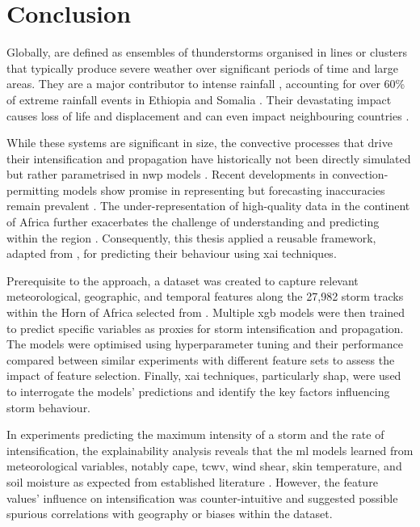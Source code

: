 \chapter{Conclusion}
\label{ch:con}

Globally,  are defined as ensembles of thunderstorms organised in lines or clusters that typically produce severe weather over significant periods of time and large areas. They are a major contributor to intense rainfall \citep{Houze2004}, accounting for over 60\% of extreme rainfall events in Ethiopia and Somalia \citep{Hill2023}. Their devastating impact causes loss of life and displacement and can even impact neighbouring countries \citep{Mamo2019,Mekuria2022,Legese2020,Zaroug2014}. 

While these systems are significant in size, the convective processes that drive their intensification and propagation have historically not been directly simulated but rather parametrised in \acrfull{nwp} models \citep{Stevens2019,Yano2018,Keane2025}. Recent developments in convection-permitting models show promise in representing  but forecasting inaccuracies remain prevalent \citep{Feng2025,Yano2018}. The under-representation of high-quality data in the continent of Africa further exacerbates the challenge of understanding and predicting  within the region \citep{Dinku2019,Kinyondo2018,Meque2021}. Consequently, this thesis applied a reusable framework, adapted from \cite{Hunt2024}, for predicting their behaviour using \acrfull{xai} techniques. 

Prerequisite to the approach, a dataset was created to capture relevant meteorological, geographic, and temporal features along the 27,982 storm tracks within the Horn of Africa selected from \cite{Hill2023}. Multiple \acrfull{xgb} models were then trained to predict specific variables as proxies for storm intensification and propagation. The models were optimised using hyperparameter tuning and their performance compared between similar experiments with different feature sets to assess the impact of feature selection. Finally, \acrshort{xai} techniques, particularly \acrshort{shap}, were used to interrogate the models' predictions and identify the key factors influencing storm behaviour.

In experiments predicting the maximum intensity of a storm and the rate of intensification, the explainability analysis reveals that the \acrfull{ml} models learned from meteorological variables, notably \acrfull{cape}, \acrfull{tcwv}, wind shear, skin temperature, and soil moisture as expected from established literature \citep{Barton2021,Taylor2017,Li2023,Klein2020,Klein2021}. However, the feature values' influence on intensification was counter-intuitive and suggested possible spurious correlations with geography or biases within the dataset. 

